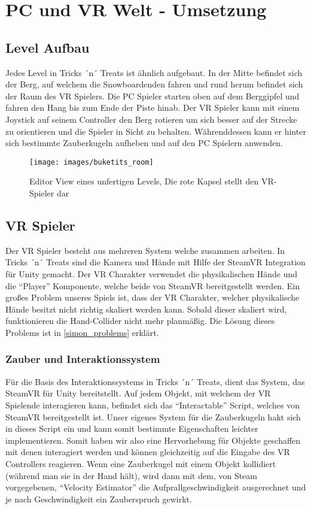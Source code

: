 \chapter{PC und VR Welt - Umsetzung}
\section{Level Aufbau}
Jedes Level in Tricks ´n´ Treats ist ähnlich aufgebaut. 
In der Mitte befindet sich der Berg, auf welchem die Snowboardenden fahren und rund herum befindet sich der Raum des VR Spielers. Die PC Spieler starten oben auf dem Berggipfel und fahren den Hang bis zum Ende der Piste hinab. Der VR Spieler kann mit einem Joystick auf seinem Controller den Berg rotieren um sich besser auf der Strecke zu orientieren und die Spieler in Sicht zu behalten. Währenddessen kann er hinter sich bestimmte Zauberkugeln aufheben und auf den PC Spielern anwenden.

\begin{figure}[H]
	\centering
	\texttt{[image: images/buketits\_room]}
	\caption{Editor View eines unfertigen Levels, Die rote Kapsel stellt den VR-Spieler dar}
\end{figure}

\section{VR Spieler} \label{simon_vrspieler}
Der VR Spieler besteht aus mehreren System welche zusammen arbeiten. In Tricks ´n´ Treats sind die Kamera und Hände mit Hilfe der SteamVR Integration für Unity gemacht. Der VR Charakter verwendet die physikalischen Hände und die "`Player"' Komponente, welche beide von SteamVR bereitgestellt werden. Ein großes Problem unseres Spiels ist, dass der VR Charakter, welcher physikalische Hände besitzt nicht richtig skaliert werden kann. Sobald dieser skaliert wird, funktionieren die Hand-Collider nicht mehr planmäßig. Die Lösung dieses Problems ist in \ref{simon_problems} erklärt.

\subsection{Zauber und Interaktionssystem}
Für die Basis des Interaktionssystems in Tricks ´n´ Treats, dient das System, das SteamVR für Unity bereitstellt. Auf jedem Objekt, mit welchem der VR Spielende interagieren kann, befindet sich das "`Interactable"' Script, welches von SteamVR bereitgestellt ist. Unser eigenes System für die Zauberkugeln hakt sich in dieses Script ein und kann somit bestimmte Eigenschaften leichter implementieren. Somit haben wir also eine Hervorhebung für Objekte geschaffen mit denen interagiert werden und können gleichzeitig auf die Eingabe des VR Controllers reagieren. Wenn eine Zauberkugel mit einem Objekt kollidiert (während man sie in der Hand hält), wird dann mit dem, von Steam vorgegebenen, "`Velocity Estimator"' die Aufprallgeschwindigkeit ausgerechnet und je nach Geschwindigkeit ein Zauberspruch gewirkt.

